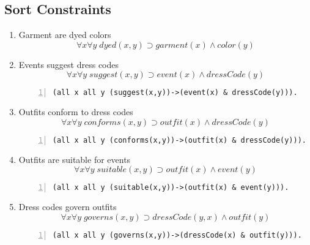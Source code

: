 \documentclass[paper=a4, fontsize=11pt]{scrartcl} %
\numberwithin{equation}{section} %
\numberwithin{figure}{section} %
\numberwithin{table}{section} %
\begin{document}
\subsection{Sort Constraints}
\begin{enumerate}
	
	
\item Garment are dyed colors
\begin{equation*}
	\forall x \forall y \; dyed(x,y) \supset garment(x) \land color(y)
\end{equation*}
	

\item Events suggest dress codes
\begin{equation*}
	\forall x \forall y \; suggest(x,y) \supset event(x) \land dressCode(y)
\end{equation*}
\begin{Verbatim}[gobble=2, numbers=left]
	(all x all y (suggest(x,y))->(event(x) & dressCode(y))).
\end{Verbatim}
	

\item Outfits conform to dress codes
\begin{equation*}
	\forall x \forall y \; conforms(x,y) \supset outfit(x) \land dressCode(y)
\end{equation*}
\begin{Verbatim}[gobble=2, numbers=left]
	(all x all y (conforms(x,y))->(outfit(x) & dressCode(y))).
\end{Verbatim}


\item Outfits are suitable for events
\begin{equation*}
	\forall x \forall y \; suitable(x,y) \supset outfit(x) \land event(y)
\end{equation*}
\begin{Verbatim}[gobble=2, numbers=left]
	(all x all y (suitable(x,y))->(outfit(x) & event(y))).
\end{Verbatim}
	

\item Dress codes govern outfits
\begin{equation*}
	\forall x \forall y \; governs(x,y) \supset dressCode(y,x) \land outfit(y)
\end{equation*}
\begin{Verbatim}[gobble=2, numbers=left]
	(all x all y (governs(x,y))->(dressCode(x) & outfit(y))).
\end{Verbatim}
	

\end{enumerate}
\end{document}
